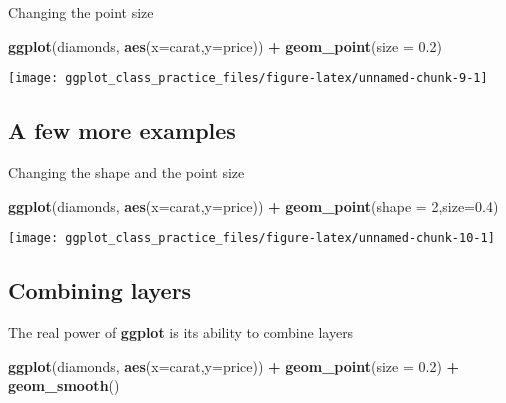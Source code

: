 \documentclass[
]{article}
\newenvironment{Shaded}{\begin{snugshade}}{\end{snugshade}}
\newcommand{\AttributeTok}[1]{\textcolor[rgb]{0.13,0.29,0.53}{#1}}
\newcommand{\DecValTok}[1]{\textcolor[rgb]{0.00,0.00,0.81}{#1}}
\newcommand{\FloatTok}[1]{\textcolor[rgb]{0.00,0.00,0.81}{#1}}
\newcommand{\FunctionTok}[1]{\textcolor[rgb]{0.13,0.29,0.53}{\textbf{#1}}}
\newcommand{\NormalTok}[1]{#1}
\newcommand{\SpecialCharTok}[1]{\textcolor[rgb]{0.81,0.36,0.00}{\textbf{#1}}}
\begin{document}
Changing the point size

\begin{Shaded}
\begin{Highlighting}[]
\FunctionTok{ggplot}\NormalTok{(diamonds, }\FunctionTok{aes}\NormalTok{(}\AttributeTok{x=}\NormalTok{carat,}\AttributeTok{y=}\NormalTok{price)) }\SpecialCharTok{+} \FunctionTok{geom\_point}\NormalTok{(}\AttributeTok{size =} \FloatTok{0.2}\NormalTok{)}
\end{Highlighting}
\end{Shaded}

\begin{center}\texttt{[image: ggplot\_class\_practice\_files/figure-latex/unnamed-chunk-9-1]} \end{center}

\hypertarget{a-few-more-examples-2}{%
\subsection{A few more examples}\label{a-few-more-examples-2}}

Changing the shape and the point size

\begin{Shaded}
\begin{Highlighting}[]
\FunctionTok{ggplot}\NormalTok{(diamonds, }\FunctionTok{aes}\NormalTok{(}\AttributeTok{x=}\NormalTok{carat,}\AttributeTok{y=}\NormalTok{price)) }\SpecialCharTok{+} \FunctionTok{geom\_point}\NormalTok{(}\AttributeTok{shape =} \DecValTok{2}\NormalTok{,}\AttributeTok{size=}\FloatTok{0.4}\NormalTok{)}
\end{Highlighting}
\end{Shaded}

\begin{center}\texttt{[image: ggplot\_class\_practice\_files/figure-latex/unnamed-chunk-10-1]} \end{center}

\hypertarget{combining-layers}{%
\subsection{Combining layers}\label{combining-layers}}

The real power of \textbf{ggplot} is its ability to combine layers

\begin{Shaded}
\begin{Highlighting}[]
\FunctionTok{ggplot}\NormalTok{(diamonds, }\FunctionTok{aes}\NormalTok{(}\AttributeTok{x=}\NormalTok{carat,}\AttributeTok{y=}\NormalTok{price)) }\SpecialCharTok{+} \FunctionTok{geom\_point}\NormalTok{(}\AttributeTok{size =} \FloatTok{0.2}\NormalTok{) }\SpecialCharTok{+}
  \FunctionTok{geom\_smooth}\NormalTok{()}
\end{Highlighting}
\end{Shaded}
\end{document}
